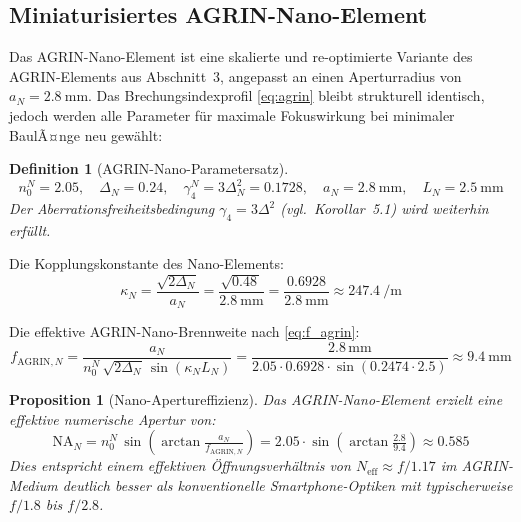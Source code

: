 ﻿\documentclass[12pt,a4paper]{article}
\newtheorem{definition}[theorem]{Definition}
\newtheorem{proposition}[theorem]{Proposition}
\theoremstyle{definition}
\newcommand{\eff}{\mathrm{eff}}
\newcommand{\AGRIN}{\mathrm{AGRIN}}
\begin{document}
	\subsection{Miniaturisiertes AGRIN-Nano-Element}

	Das AGRIN-Nano-Element ist eine skalierte und re-optimierte Variante des
	AGRIN-Elements aus Abschnitt~3, angepasst an einen Aperturradius von
	$a_N = \SI{2.8}{\milli\metre}$.  Das Brechungsindexprofil \eqref{eq:agrin}
	bleibt strukturell identisch, jedoch werden alle Parameter f\"ur maximale
	Fokuswirkung bei minimaler BaulÃ¤nge neu gew\"ahlt:

	\begin{definition}[AGRIN-Nano-Parametersatz]
		\begin{equation}
			n_0^N = 2.05,\quad
			\Delta_N = 0.24,\quad
			\gamma_4^N = 3\Delta_N^2 = 0.1728,\quad
			a_N = \SI{2.8}{\milli\metre},\quad
			L_N = \SI{2.5}{\milli\metre}
			\label{eq:agrin_nano_params}
		\end{equation}
		Der Aberrationsfreiheitsbedingung $\gamma_4 = 3\Delta^2$ (vgl.\
		Korollar~5.1) wird weiterhin erf\"ullt.
	\end{definition}

	Die Kopplungskonstante des Nano-Elements:
	\begin{equation}
		\kappa_N = \frac{\sqrt{2\Delta_N}}{a_N}
		= \frac{\sqrt{0.48\,}}{\SI{2.8}{\milli\metre}}
		= \frac{0.6928}{\SI{2.8}{\milli\metre}}
		\approx \SI{247.4}{\per\metre}
		\label{eq:kappa_nano}
	\end{equation}

	Die effektive AGRIN-Nano-Brennweite nach \eqref{eq:f_agrin}:
	\begin{equation}
		f_{\AGRIN,N}
		= \frac{a_N}{n_0^N\,\sqrt{2\Delta_N}\,
			\sin\!\left(\kappa_N L_N\right)}
		= \frac{2.8\,\mathrm{mm}}{2.05\cdot 0.6928\cdot
			\sin(0.2474\cdot 2.5)}
		\approx \SI{9.4}{\milli\metre}
		\label{eq:fagrin_nano}
	\end{equation}

	\begin{proposition}[Nano-Apertureffizienz]
		Das AGRIN-Nano-Element erzielt eine effektive numerische Apertur von:
		\begin{equation}
			\mathrm{NA}_N
			= n_0^N\,\sin\!\left(\arctan\tfrac{a_N}{f_{\AGRIN,N}}\right)
			= 2.05\cdot\sin\!\left(\arctan\tfrac{2.8}{9.4}\right)
			\approx 0.585
			\label{eq:na_nano}
		\end{equation}
		Dies entspricht einem effektiven \"Offnungsverh\"altnis von
		$N_\eff \approx f/1.17$ im AGRIN-Medium \textemdash deutlich besser als
		konventionelle Smartphone-Optiken mit typischerweise $f/1.8$
		bis $f/2.8$.
	\end{proposition}
\end{document}
